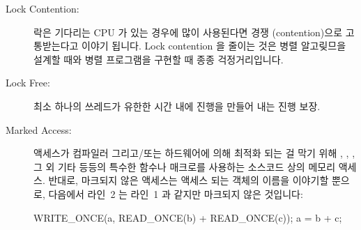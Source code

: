 \begin{description}
\fi

\item[Lock Contention:]
	락은 기다리는 CPU 가 있는 경우에 많이 사용된다면 경쟁 (contention)으로
	고통받는다고 이야기 됩니다.
	Lock contention 을 줄이는 것은 병렬 알고맂므을 설계할 때와 병렬
	프로그램을 구현할 때 종종 걱정거리입니다.
\item[Lock Free:]
	최소 하나의 쓰레드가 유한한 시간 내에 진행을 만들어 내는 진행 보장.
\item[Marked Access:]
	액세스가 컴파일러 그리고/또는 하드웨어에 의해 최적화 되는 걸 막기 위해
	, , , 그 외 기타
	등등의 특수한 함수나 매크로를 사용하는 소스코드 상의 메모리 액세스.
	반대로, 마크되지 않은 액세스는 액세스 되는 객체의 이름을 이야기할
	뿐으로, 다음에서 라인~2 는 라인~1 과 같지만 마크되지 않은 것입니다:
	\begin{VerbatimN}
	WRITE_ONCE(a, READ_ONCE(b) + READ_ONCE(c));
	a = b + c;
	\end{VerbatimN}

\iffalse

\item[Lock Contention:]\index{Lock contention}
	A lock is said to be suffering contention when it is being
	used so heavily that there is often a CPU waiting on it.
	Reducing lock contention is often a concern when designing
	parallel algorithms and when implementing parallel programs.
\item[Lock Free:]\index{Lock free}
	A forward-progress guarantee in which at least one thread makes
	progress within a finite period of time.
\item[Marked Access:]\index{Marked access}
	A source-code memory access that uses a special function or
	macro, such as \co{READ_ONCE()}, \co{WRITE_ONCE()},
	\co{atomic_inc()}, and so on, in order to protect that access
	from compiler and/or hardware optimizations.
	In contrast, an unmarked access simply mentions the name of
	the object being accessed, so that in the following, line~2
	is the unmarked equivalent of line~1:
	\begin{VerbatimN}
	WRITE_ONCE(a, READ_ONCE(b) + READ_ONCE(c));
	a = b + c;
	\end{VerbatimN}

\fi


\end{description}
